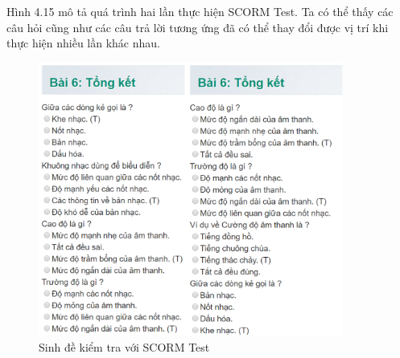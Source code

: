 Hình 4.15 mô tả quá trình hai lần thực hiện SCORM Test. Ta có thể thấy các câu hỏi cũng như các câu trả lời tương ứng đã có thể thay đổi được vị trí khi thực hiện nhiều lần khác nhau.

	\begin{center}
		\begin{figure}[htp]
			\begin{center}
				\includegraphics[width=10cm]{Chapter4/Pictures/picture415.png}
			\end{center}
			\caption{Sinh đề kiểm tra với SCORM Test }
			\label{refpicture512}
		\end{figure}
	\end{center}








